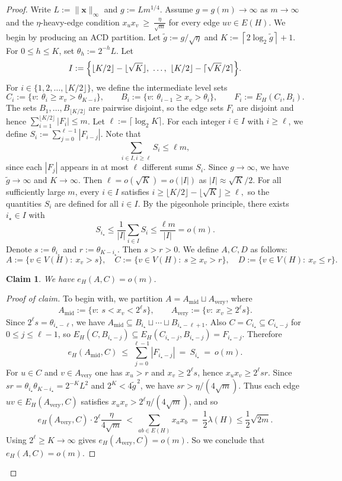 \documentclass[11pt]{article}
\newtheorem{claim}{Claim}
\theoremstyle{definition}
\theoremstyle{plain}
\newenvironment{poc}{\begin{proof}[Proof of claim]\renewcommand*{\qedsymbol}{$\blacksquare$}}{\end{proof}}
\begin{document}
\begin{proof}  
Write $L:=\|\bm{x}\|_\infty$ and $g:=Lm^{1/4}$.
Assume $g=g(m)\to\infty$ as $m\to\infty$ and the $\eta$-heavy-edge condition
$ x_u x_v\ \ge\ \frac{\eta}{\sqrt m}$ for every edge $uv\in E(H)$.  
We begin by producing an ACD partition. 
Let $\widetilde g:=g/\sqrt\eta$ and $ K:=\left\lceil 2\log_2 \widetilde g\right\rceil+1$. 
For \(0\le h\le K\), set \(\theta_h:=2^{-h}L\).
Let
\[
  I:=\Bigl\{\lfloor K/2\rfloor-\lfloor\sqrt K\rfloor,\ \dots,\ \lfloor K/2\rfloor-\lceil\sqrt K/2\rceil\Bigr\}.
\]
For $i\in\{1,2,\dots,\lfloor K/2\rfloor\}$, we define the intermediate level sets
\[
  C_i:=\{v:\ \theta_i\ge x_v>\theta_{K-i}\},
  \qquad
  B_i:=\{v:\ \theta_{i-1}\ge x_v>\theta_i\},
  \qquad
  F_i:=E_H(C_i,B_i).
\]
The sets $B_1,\dots,B_{\lfloor K/2\rfloor}$ are pairwise disjoint, so the edge sets $F_i$ are disjoint and hence
$\sum_{i=1}^{\lfloor K/2\rfloor}|F_i|\le m$. 
Let $\ell:=\lceil \log_2 K\rceil$.
For each integer $i\in I$ with $i\ge \ell$, we define $S_i:=\sum_{j=0}^{\ell-1}|F_{i-j}|$.
Note that 
\[
 \sum_{{i\in I, i\ge \ell}} S_i \le \ell m,
\]
since each $|F_j|$ appears in at most $\ell$ different sums $S_i$. 
Since $g\to\infty$, we have $\widetilde{g} \to \infty$ and $K\to\infty$. Then $\ell=o(\sqrt K)=o(|I|)$ as $|I| \approx \sqrt{K}/2$. 
For all sufficiently large \(m\), every \(i\in I\) satisfies
$i\ge \lfloor K/2\rfloor-\lfloor\sqrt K\rfloor \ge \ell,$
so the quantities \(S_i\) are defined for all \(i\in I\).
By the pigeonhole principle, 
there exists $i_\star\in I$ with
\[
 S_{i_\star} \le \frac{1}{|I|} \sum_{i\in I} S_i \le \frac{\ell m}{|I|}= o(m).
\]
Denote $s:=\theta_{i_\star}$ and $r:=\theta_{K-i_\star}$. Then $s>r >0$. We define $A,C,D$ as follows:
\[
  A:=\{v \in V(H):\ x_v>s\},\quad
  C:=\{v\in V(H):\ s\ge x_v>r\},\quad
  D:=\{v\in V(H):\ x_v\le r\}.
\] 

\begin{claim}
We have \(e_H(A,C)=o(m)\).
\end{claim}

\begin{poc}
To begin with, we partition $A=A_{\mathrm{mid}}\sqcup A_{\mathrm{very}}$, where 
\[
  A_{\mathrm{mid}}:=\{v:\ s<x_v<2^\ell s\},
  \qquad
  A_{\mathrm{very}}:=\{v:\ x_v\ge 2^\ell s\}. 
\]
Since $2^\ell s=\theta_{i_\star-\ell}$, we have
$A_{\mathrm{mid}}\subseteq B_{i_\star}\sqcup\cdots\sqcup B_{i_\star-\ell+1}$.
Also $C=C_{i_\star}\subseteq C_{i_\star-j}$ for $0\le j\le \ell-1$, so
$E_H(C,B_{i_\star-j})\subseteq E_H(C_{i_\star-j},B_{i_\star-j})=F_{i_\star-j}$.
Therefore
\[
  e_H(A_{\mathrm{mid}},C)\ \le\ \sum_{j=0}^{\ell-1}|F_{i_\star-j}|\ =\ S_{i_\star}\ =\ o(m).
\] 
For $u\in C$ and $v\in A_{\mathrm{very}}$ one has $x_u>r$ and $x_v\ge 2^\ell s$, hence $x_u x_v\ge 2^\ell sr$.
Since $sr=\theta_{i_\star}\theta_{K-i_\star}=2^{-K}L^2$ and $2^K<4\widetilde g^{\,2}$, we have
$sr>\eta/(4\sqrt m)$.
Thus each edge $uv\in E_H(A_{\mathrm{very}},C)$ satisfies $x_u x_v>2^\ell\eta/(4\sqrt m)$, and so
\[
  e_H(A_{\mathrm{very}},C)\cdot 2^\ell\frac{\eta}{4\sqrt m}
  \ <\
  \sum_{ab\in E(H)}x_ax_b
  \ =\ \frac{1}{2}\lambda(H) \le \frac{1}{2}\sqrt{2m}.
\]
Using $2^\ell\ge K\to\infty$ gives
$e_H(A_{\mathrm{very}},C)=o(m)$. 
So we conclude that $e_H(A,C)=o(m)$.
\end{poc}


\end{proof}
\end{document}
